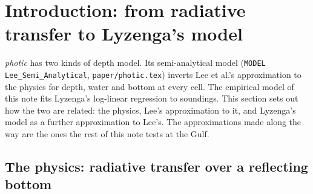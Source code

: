 \documentclass[11pt]{article}
\numberwithin{equation}{section}
\newcommand{\code}[1]{\texttt{#1}}
\begin{document}
\begin{abstract}
Lyzenga's 1978 paper adds two things. Dividing the error by the local gain (its eq.~17) makes
$\sigma$ grow where the fit saturates: beyond 15\,m, 87\% of the test errors now lie within
$\pm1\sigma$, against 23\%. Its depth-invariant bottom indices, computed with the local
attenuation, remove most of the depth from the signal but not all, and do not yet give a
consistent bottom map at the Gulf. Asking for one bottom in every scene (\code{CONSISTENT}) recovers
the depth exactly on synthetic data, but not at the Gulf, where depth explains only about half of
the scenes' differences.
\end{abstract}

\tableofcontents

\section{Introduction: from radiative transfer to Lyzenga's model}
\label{sec:intro}

\textit{photic} has two kinds of depth model. Its semi-analytical model (\code{MODEL
Lee\_Semi\_Analytical}, \code{paper/photic.tex}) inverts Lee et al.'s approximation to the
physics for depth, water and bottom at every cell. The empirical model of this note fits
Lyzenga's log-linear regression to soundings. This section sets out how the two are related:
the physics, Lee's approximation to it, and Lyzenga's model as a further approximation to
Lee's. The approximations made along the way are the ones the rest of this note tests at the Gulf.

\subsection{The physics: radiative transfer over a reflecting bottom}
\end{document}
